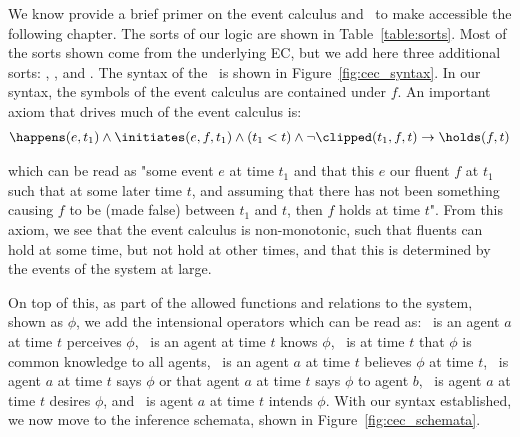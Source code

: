We know provide a brief primer on the event calculus and \CEC\ to make
accessible the following chapter. The sorts of our logic are shown in 
Table~\ref{table:sorts}. Most of the sorts shown come from the underlying EC,
but we add here three additional sorts: \Agent, \Action, and \ActionType.
The syntax of the \CEC\ is shown in Figure~\ref{fig:cec_syntax}. In our
syntax, the symbols of the event calculus are contained under $\mathit{f}$.
An important axiom that drives much of the event calculus is:
\vspace{-0.4cm}
\begin{equation*}
    \begin{aligned}
        \happens(e, t_{1}) \land \initiates(e, f, t_{1}) \land (t_{1} < t) \land \lnot\clipped(t_{1}, f, t) \rightarrow \holds(f, t)
    \end{aligned}
\end{equation*}

\noindent
which can be read as "some event $e$ \happens at time $t_{1}$ and that this $e$
\initiates our fluent $f$ at $t_1$ such that at some later time $t$, and assuming
that there has not been something causing $f$ to be \clipped (made false) between
$t_{1}$ and $t$, then $f$ holds at time $t$". From this axiom, we see that the
event calculus is non-monotonic, such that fluents can hold at some time, but
not hold at other times, and that this is determined by the events of the
system at large.

On top of this, as part of the allowed functions and relations to the system,
shown as $\mathit{\phi}$, we add the intensional operators which can be read as:
\perceives\ is an agent $a$ at time $t$ perceives $\mathit{\phi}$, \knows\
is an agent at time $t$ knows $\mathit{\phi}$, \common\ is at time $t$ that
$\mathit{\phi}$ is common knowledge to all agents, \believes\ is
an agent $a$ at time $t$ believes $\mathit{\phi}$ at time $t$, \says\ is
agent $a$ at time $t$ says $\mathit{\phi}$ or that agent $a$ at time $t$
says $\mathit{\phi}$ to agent $b$, \desires\ is agent $a$ at time $t$ desires
$\mathit{\phi}$, and \intends\ is agent $a$ at time $t$ intends $\mathit{\phi}$.
With our syntax established, we now move to the inference schemata, shown in
Figure~\ref{fig:cec_schemata}.

